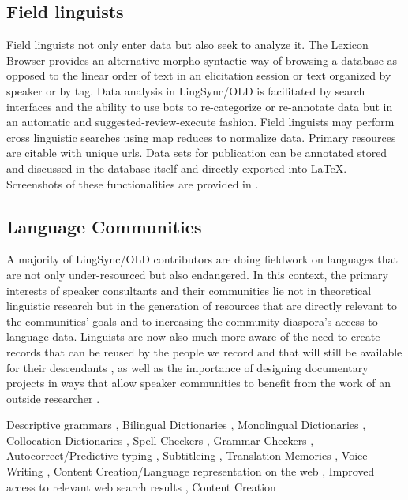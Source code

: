 \documentclass[11pt]{article}
\begin{document}
\subsection{Field linguists}

Field linguists not only enter data but also seek to analyze it. The Lexicon Browser provides an alternative morpho-syntactic way of browsing a database as opposed to the linear order of text in an elicitation session or text organized by speaker or by tag. Data analysis in LingSync/OLD is facilitated by search  interfaces and the ability to use bots to re-categorize or re-annotate data but in an automatic and suggested-review-execute fashion. Field linguists may perform cross linguistic searches using map reduces to normalize data. Primary resources are citable with unique urls. Data sets for publication can be annotated stored and discussed in the database itself and directly exported into LaTeX.  Screenshots of these functionalities are provided in \cite{lingsync:2012}.

%
\subsection{Language Communities}

A majority of LingSync/OLD contributors are doing fieldwork on languages that
are not only under-resourced but also endangered. In this context, the primary
interests of speaker consultants and their communities lie not in theoretical
linguistic research but in the generation of resources that are directly
relevant to the communities' goals and to increasing the community diaspora's
access to language data. Linguists are now also much more aware of the need to
create records that can be reused by the people we record and that will still be
available for their descendants \cite[p.129]{Thieberger:2012}, as well as the
importance of designing documentary projects in ways that allow speaker
communities to benefit from the work of an outside researcher \cite{Good:2012}.


	 Descriptive grammars
	, Bilingual Dictionaries 
	, Monolingual Dictionaries
	, Collocation Dictionaries
	, Spell Checkers
	, Grammar Checkers
	, Autocorrect/Predictive typing
	, Subtitleing
	, Translation Memories
	, Voice Writing
	, Content Creation/Language representation on the web
	, Improved access to relevant web search results
	, Content Creation
\end{document}

